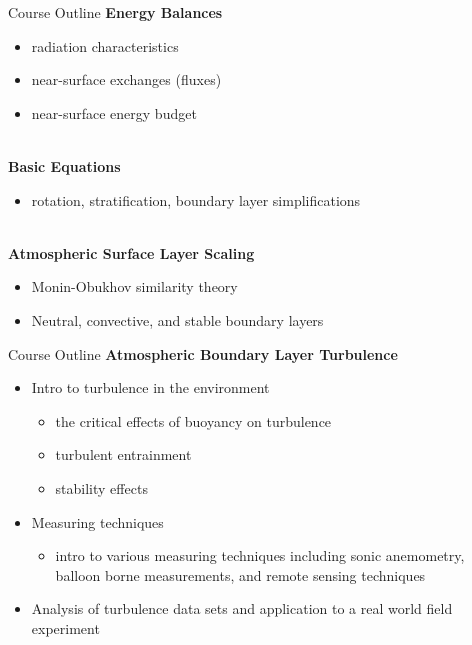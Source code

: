 
\begin{frame}{Course Outline}
\textbf{Energy Balances}
\begin{itemize}
\item radiation characteristics
\item near-surface exchanges (fluxes)
\item near-surface energy budget
\end{itemize}
~\\
\textbf{Basic Equations}
\begin{itemize}
\item rotation, stratification, boundary layer simplifications
\end{itemize}
~\\
\textbf{Atmospheric Surface Layer Scaling}
\begin{itemize}
\item Monin-Obukhov similarity theory
\item Neutral, convective, and stable boundary layers
\end{itemize}
\end{frame}


\begin{frame}{Course Outline}
\textbf{Atmospheric Boundary Layer Turbulence}
\begin{itemize}
\item Intro to turbulence in the environment
	\begin{itemize}
		\item the critical effects of buoyancy on turbulence
		\item turbulent entrainment
		\item stability effects
	\end{itemize}
\item Measuring techniques
	\begin{itemize}
		\item intro to various measuring techniques including sonic anemometry, balloon borne measurements, and remote sensing techniques
	\end{itemize}
\item Analysis of turbulence data sets and application to a real world field experiment
\end{itemize}

\end{frame}


